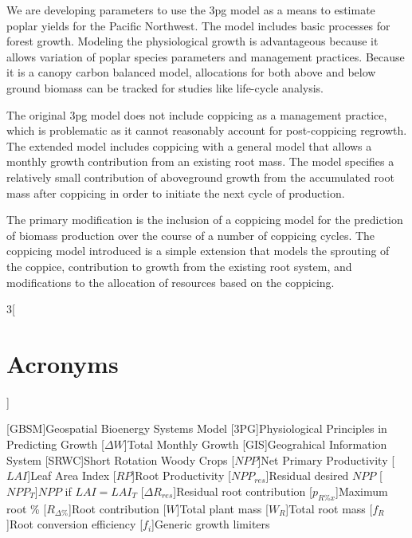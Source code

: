 \documentclass[10pt]{article}
\begin{document}
We are developing parameters to use the \acf{3pg} model as a means to
estimate poplar yields for the Pacific Northwest.  The model includes
basic processes for forest growth.  Modeling the physiological growth
is advantageous because it allows variation of poplar species
parameters and management practices.  Because it is a canopy carbon
balanced model, allocations for both above and below ground biomass
can be tracked for studies like life-cycle analysis.

The original \ac{3pg} model does not include coppicing as a management
practice, which is problematic as it cannot reasonably account for
post-coppicing regrowth.  The extended model includes coppicing with a
general model that allows a monthly growth contribution from an
existing root mass.  The model specifies a relatively small
contribution of aboveground growth from the accumulated root mass
after coppicing in order to initiate the next cycle of production.

The primary modification is the inclusion of a coppicing model for the
prediction of biomass production over the course of a number of
coppicing cycles.  The coppicing model introduced is a simple extension
that models the sprouting of the coppice, contribution to growth from
the existing root system, and modifications to the allocation of
resources based on the coppicing.

\begin{multicols}{3}[\section*{Acronyms}]
{\normalsize
\raggedright
\begin{acronym}
[\textsc{GBSM}]{Geospatial Bioenergy Systems Model}
[\textsc{3PG}]{Physiological Principles in Predicting Growth}
[\ensuremath{\Delta W}]{Total Monthly Growth}
[\textsc{GIS}]{Geograhical Information System}
[\textsc{SRWC}]{Short Rotation Woody Crops}
[\ensuremath{NPP}]{Net Primary Productivity}
[\ensuremath{LAI}]{Leaf Area Index}
[\ensuremath{RP}]{Root Productivity}
[\ensuremath{NPP_{res}}]{Residual desired $NPP$}
[\ensuremath{NPP_{T}}]{$NPP$ if $LAI = LAI_{T}$}
[\ensuremath{\Delta R_{res}}]{Residual root contribution}
[\ensuremath{p_{R\%x}}]{Maximum root \%}
[\ensuremath{R_{\Delta\%}}]{Root contribution}
[\ensuremath{W}]{Total plant mass}
[\ensuremath{W_R}]{Total root mass}
[\ensuremath{f_R}]{Root conversion efficiency}
[\ensuremath{f_i}]{Generic growth limiters}
\end{acronym}
}
\end{multicols}
\end{document}
